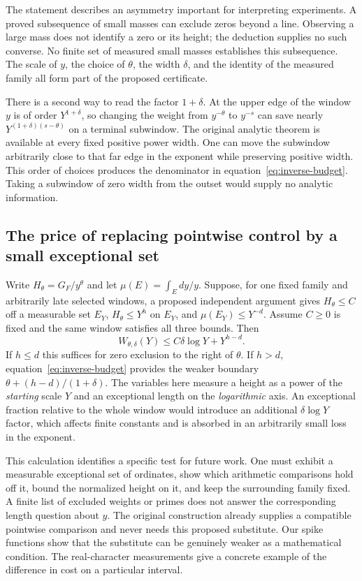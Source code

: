 \documentclass[12pt,letterpaper]{article}
\begin{document}
The statement describes an asymmetry important for interpreting experiments. A proved subsequence of small masses can exclude zeros beyond a line. Observing a large mass does not identify a zero or its height; the deduction supplies no such converse. No finite set of measured small masses establishes this subsequence. The scale of \(y\), the choice of \(\theta\), the width \(\delta\), and the identity of the measured family all form part of the proposed certificate.

There is a second way to read the factor \(1+\delta\). At the upper edge of the window \(y\) is of order \(Y^{1+\delta}\), so changing the weight from \(y^{-\theta}\) to \(y^{-s}\) can save nearly \(Y^{(1+\delta)(s-\theta)}\) on a terminal subwindow. The original analytic theorem is available at every fixed positive power width. One can move the subwindow arbitrarily close to that far edge in the exponent while preserving positive width. This order of choices produces the denominator in equation~\eqref{eq:inverse-budget}. Taking a subwindow of zero width from the outset would supply no analytic information.

\subsection{The price of replacing pointwise control by a small exceptional set}
Write \(H_\theta=G_F/y^\theta\) and let \(\mu(E)=\int_Edy/y\). Suppose, for one fixed family and arbitrarily late selected windows, a proposed independent argument gives \(H_\theta\le C\) off a measurable set \(E_Y\), \(H_\theta\le Y^h\) on \(E_Y\), and \(\mu(E_Y)\le Y^{-d}\). Assume \(C\ge0\) is fixed and the same window satisfies all three bounds. Then
\[
       W_{\theta,\delta}(Y)\le C\delta\log Y+Y^{h-d}.
\]
If \(h\le d\) this suffices for zero exclusion to the right of \(\theta\). If \(h>d\), equation~\eqref{eq:inverse-budget} provides the weaker boundary \(\theta+(h-d)/(1+\delta)\). The variables here measure a height as a power of the \emph{starting} scale \(Y\) and an exceptional length on the \emph{logarithmic} axis. An exceptional fraction relative to the whole window would introduce an additional \(\delta\log Y\) factor, which affects finite constants and is absorbed in an arbitrarily small loss in the exponent.

This calculation identifies a specific test for future work. One must exhibit a measurable exceptional set of ordinates, show which arithmetic comparisons hold off it, bound the normalized height on it, and keep the surrounding family fixed. A finite list of excluded weights or primes does not answer the corresponding length question about \(y\). The original construction already supplies a compatible pointwise comparison and never needs this proposed substitute. Our spike functions show that the substitute can be genuinely weaker as a mathematical condition. The real-character measurements give a concrete example of the difference in cost on a particular interval.
\end{document}
